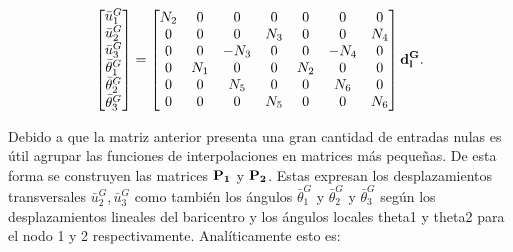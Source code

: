 \begin{equation}\label{Eqn:PRE:LocalDispsTransform}
	\begin{bmatrix}
		\bar{u}_1^G\\
		\bar{u}_2^G\\
		\bar{u}_3^G\\
		 \bar{\theta}_1^G\\
		 \bar{\theta}_2^G\\
		 \bar{\theta}_3^G\\
	\end{bmatrix}
=
\begin{bmatrix}
	N_2 &0  & 0 & 0 & 0 & 0 & 0   \\
	0 & 0 & 0 & N_3 & 0 &0  &N_4  \\
	0& 0 &-N_3  & 0 &0  & -N_4 &0 \\
	0 & N_1 & 0 & 0 &N_2  & 0 &0   \\
	0&0  & N_5 & 0 & 0 & N_6 &0   \\
	0 & 0 & 0 & N_5 & 0 & 0 & N_6   \\
\end{bmatrix} \bf{d_l^G}.
\end{equation}

Debido a que la matriz anterior presenta una gran cantidad de entradas nulas es útil agrupar las funciones de interpolaciones en matrices más pequeñas. De esta forma se construyen las matrices $\bf{P_1}$ y $\bf{P_2}$.  Estas expresan los desplazamientos transversales  $\bar{u}_2^G, \bar{u}_3^G $  como también los ángulos $\bar{\theta}_1^G$  y $\bar{\theta}_2^G$ y $\bar{\theta}_3^G$ según los desplazamientos lineales del baricentro y los ángulos locales  \gls{theta1} y  \gls{theta2} para el nodo 1 y 2 respectivamente. Analíticamente esto es:


